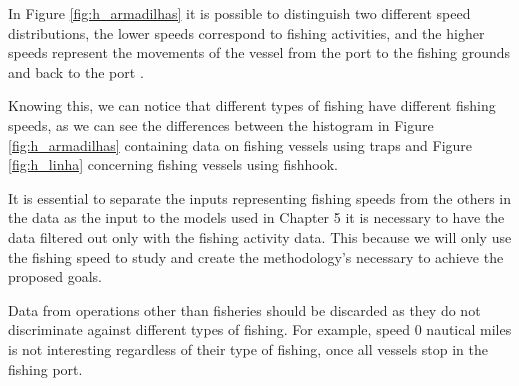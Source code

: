 In Figure \ref{fig:h_armadilhas} it is possible to distinguish two different speed distributions, the lower speeds correspond to fishing activities, and the higher speeds represent the movements of the vessel from the port to the fishing grounds and back to the port \cite{MappingFishing}.





Knowing this, we can notice that different types of fishing have different fishing speeds, as we can see the differences between the histogram in Figure \ref{fig:h_armadilhas} containing data on fishing vessels using traps and Figure \ref{fig:h_linha} concerning fishing vessels using fishhook.





It is essential to separate the inputs representing fishing speeds from the others in the data as the input to the models used in Chapter 5 it is necessary to have the data filtered out only with the fishing activity data. This because we will only use the fishing speed to study and create the methodology's necessary to achieve the proposed goals.

Data from operations other than fisheries should be discarded as they do not discriminate against different types of fishing. For example, speed 0 nautical miles is not interesting regardless of their type of fishing, once all vessels stop in the fishing port.







